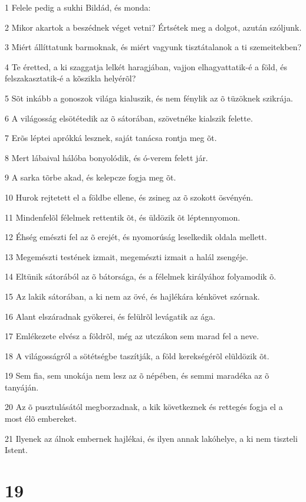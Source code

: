 \par 1 Felele pedig a sukhi Bildád, és monda:
\par 2 Mikor akartok a beszédnek véget vetni? Értsétek meg a dolgot, azután szóljunk.
\par 3 Miért állíttatunk barmoknak, és miért vagyunk tisztátalanok a ti szemeitekben?
\par 4 Te éretted, a ki szaggatja lelkét haragjában, vajjon elhagyattatik-é a föld, és felszakasztatik-é a kõszikla helyérõl?
\par 5 Sõt inkább a gonoszok világa kialuszik, és nem fénylik az õ tüzöknek szikrája.
\par 6 A világosság elsötétedik az õ sátorában, szövetnéke kialszik felette.
\par 7 Erõs léptei aprókká lesznek, saját tanácsa rontja meg õt.
\par 8 Mert lábaival hálóba bonyolódik, és ó-verem felett jár.
\par 9 A sarka tõrbe akad, és kelepcze fogja meg õt.
\par 10 Hurok rejtetett el a földbe ellene, és zsineg az õ szokott ösvényén.
\par 11 Mindenfelõl félelmek rettentik õt, és üldözik õt léptennyomon.
\par 12 Éhség emészti fel az õ erejét, és nyomorúság leselkedik oldala mellett.
\par 13 Megemészti testének izmait, megemészti izmait a halál zsengéje.
\par 14 Eltünik sátorából az õ bátorsága, és a félelmek királyához folyamodik õ.
\par 15 Az lakik sátorában, a ki nem az övé, és hajlékára kénkövet szórnak.
\par 16 Alant elszáradnak gyökerei, és felülrõl levágatik az ága.
\par 17 Emlékezete elvész a földrõl, még az utczákon sem marad fel a neve.
\par 18 A világosságról a sötétségbe taszítják, a föld kerekségérõl elüldözik õt.
\par 19 Sem fia, sem unokája nem lesz az õ népében, és semmi maradéka az õ tanyáján.
\par 20 Az õ pusztulásától megborzadnak, a kik következnek és rettegés fogja el a most élõ embereket.
\par 21 Ilyenek az álnok embernek hajlékai, és ilyen annak lakóhelye, a ki nem tiszteli Istent.

\chapter{19}

